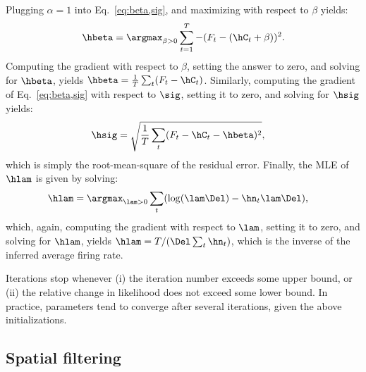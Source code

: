 Plugging $\alpha=1$ into Eq.~\eqref{eq:beta,sig}, and maximizing with respect to $\beta$ yields:
\begin{align}
\hbeta = \argmax_{\beta>0} \sum_{t=1}^T -(F_t - (\hC_t + \beta))^2.
\end{align}
\noindent Computing the gradient with respect to $\beta$, setting the answer to zero, and solving for $\hbeta$, yields $\hbeta = \frac{1}{T} \sum_t (F_t-\hC_t)$.  Similarly, computing the gradient of Eq.~\eqref{eq:beta,sig} with respect to $\sig$, setting it to zero, and solving for $\hsig$ yields:
\begin{align}
\hsig &= \sqrt{\frac{1}{T} \sum_t (F_t - \hC_t - \hbeta)^2},
\end{align}
which is simply the root-mean-square of the residual error.  Finally, the MLE of $\hlam$ is given by solving:
\begin{align}
\hlam &= \argmax_{\lam>0} \sum_t (\log (\lam \Del) - \hn_t \lam \Del),
\end{align}
which, again, computing the gradient with respect to $\lam$, setting it to zero, and solving for $\hlam$, yields $\hlam=T/ (\Del \sum_t \hn_t)$, which is the inverse of the inferred average firing rate.


Iterations stop whenever (i) the iteration number exceeds some upper bound, or (ii) the relative change in likelihood does not exceed some lower bound.  In practice, parameters tend to converge after several iterations, given the above initializations. 


\subsection{Spatial filtering} \label{sec:methods:spatial}

